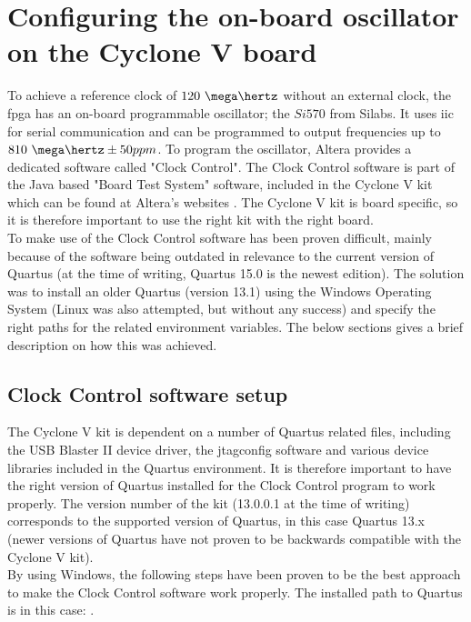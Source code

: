 \documentclass[main.tex]{subfiles}
\begin{document}
\section{Configuring the on-board oscillator on the Cyclone V board}

To achieve a reference clock of $120~\mega\hertz$ without an external clock, the \gls{fpga} has an on-board programmable oscillator; the $Si570$ from Silabs. It uses \gls{iic} for serial communication and can be programmed to output frequencies up to $810~\mega\hertz \pm 50 ppm$. To program the oscillator, Altera provides a dedicated software called "Clock Control". The Clock Control software is part of the Java based "Board Test System" software, included in the Cyclone V kit which can be found at Altera's websites \cite{altera_cyclonekit}. The Cyclone V kit is board specific, so it is therefore important to use the right kit with the right board.\\

To make use of the Clock Control software has been proven difficult, mainly because of the software being outdated in relevance to the current version of Quartus (at the time of writing, Quartus 15.0 is the newest edition). The solution was to install an older Quartus (version 13.1) using the Windows Operating System (Linux was also attempted, but without any success) and specify the right paths for the related environment variables. The below sections gives a brief description on how this was achieved.\\

\subsection{Clock Control software setup}

The Cyclone V kit is dependent on a number of Quartus related files, including the USB Blaster II device driver, the jtagconfig software and various device libraries included in the Quartus environment. It is therefore important to have the right version of Quartus installed for the Clock Control program to work properly. The version number of the kit (13.0.0.1 at the time of writing) corresponds to the supported version of Quartus, in this case Quartus 13.x (newer versions of Quartus have not proven to be backwards compatible with the Cyclone V kit).\\

By using Windows, the following steps have been proven to be the best approach to make the Clock Control software work properly. The installed path to Quartus is in this case: .\\
\end{document}
